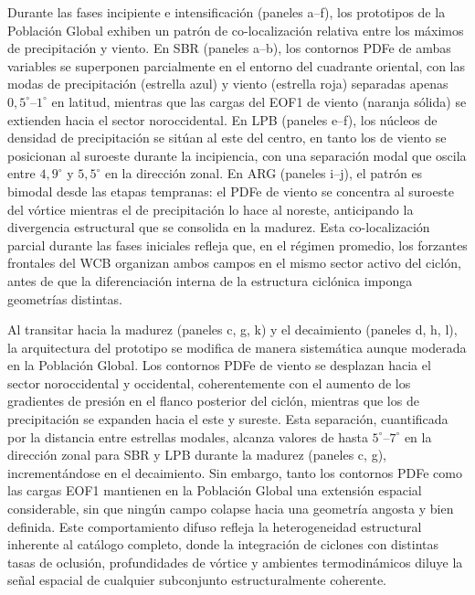 Durante las fases incipiente e intensificación (paneles a--f), los prototipos de la Población Global exhiben un patrón de co-localización relativa entre los máximos de precipitación y viento. En SBR (paneles a--b), los contornos PDFe de ambas variables se superponen parcialmente en el entorno del cuadrante oriental, con las modas de precipitación (estrella azul) y viento (estrella roja) separadas apenas $0{,}5^{\circ}$--$1^{\circ}$ en latitud, mientras que las cargas del EOF1 de viento (naranja sólida) se extienden hacia el sector noroccidental. En LPB (paneles e--f), los núcleos de densidad de precipitación se sitúan al este del centro, en tanto los de viento se posicionan al suroeste durante la incipiencia, con una separación modal que oscila entre $4{,}9^{\circ}$ y $5{,}5^{\circ}$ en la dirección zonal. En ARG (paneles i--j), el patrón es bimodal desde las etapas tempranas: el PDFe de viento se concentra al suroeste del vórtice mientras el de precipitación lo hace al noreste, anticipando la divergencia estructural que se consolida en la madurez. Esta co-localización parcial durante las fases iniciales refleja que, en el régimen promedio, los forzantes frontales del WCB organizan ambos campos en el mismo sector activo del ciclón, antes de que la diferenciación interna de la estructura ciclónica imponga geometrías distintas.

Al transitar hacia la madurez (paneles c, g, k) y el decaimiento (paneles d, h, l), la arquitectura del prototipo se modifica de manera sistemática aunque moderada en la Población Global. Los contornos PDFe de viento se desplazan hacia el sector noroccidental y occidental, coherentemente con el aumento de los gradientes de presión en el flanco posterior del ciclón, mientras que los de precipitación se expanden hacia el este y sureste. Esta separación, cuantificada por la distancia entre estrellas modales, alcanza valores de hasta $5^{\circ}$--$7^{\circ}$ en la dirección zonal para SBR y LPB durante la madurez (paneles c, g), incrementándose en el decaimiento. Sin embargo, tanto los contornos PDFe como las cargas EOF1 mantienen en la Población Global una extensión espacial considerable, sin que ningún campo colapse hacia una geometría angosta y bien definida. Este comportamiento difuso refleja la heterogeneidad estructural inherente al catálogo completo, donde la integración de ciclones con distintas tasas de oclusión, profundidades de vórtice y ambientes termodinámicos diluye la señal espacial de cualquier subconjunto estructuralmente coherente.

